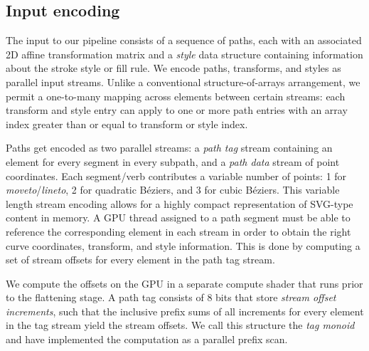 \documentclass[sigconf]{acmart}
\begin{document}
\subsection{Input encoding}

The input to our pipeline consists of a sequence of paths, each with an associated 2D affine transformation matrix and a \emph{style} data structure containing information about the stroke style or fill rule. We encode paths, transforms, and styles as parallel input streams. Unlike a conventional structure-of-arrays arrangement, we permit a one-to-many mapping across elements between certain streams: each transform and style entry can apply to one or more path entries with an array index greater than or equal to transform or style index.

Paths get encoded as two parallel streams: a \emph{path tag} stream containing an element for every segment in every subpath, and a \emph{path data} stream of point coordinates. Each segment/verb contributes a variable number of points: 1 for \emph{moveto}/\emph{lineto}, 2 for quadratic Béziers, and 3 for cubic Béziers. This variable length stream encoding allows for a highly compact representation of SVG-type content in memory. A GPU thread assigned to a path segment must be able to reference the corresponding element in each stream in order to obtain the right curve coordinates, transform, and style information. This is done by computing a set of stream offsets for every element in the path tag stream.


We compute the offsets on the GPU in a separate compute shader that runs prior to the flattening stage. A path tag consists of 8 bits that store \emph{stream offset increments}, such that the inclusive prefix sums of all increments for every element in the tag stream yield the stream offsets. We call this structure the \emph{tag monoid} and have implemented the computation as a parallel prefix scan.
\end{document}
